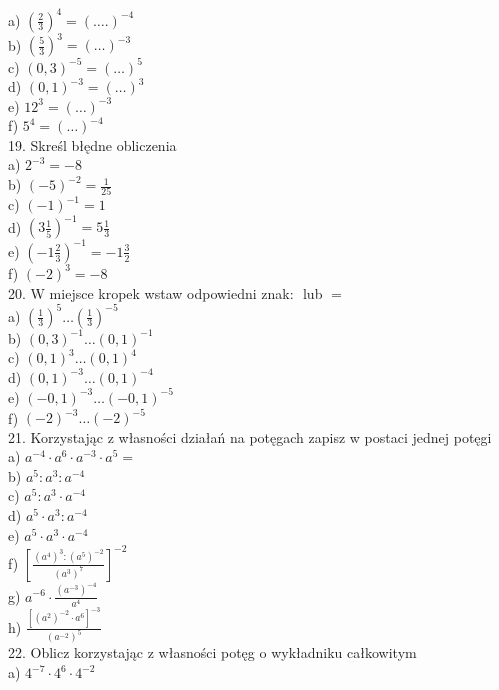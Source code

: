\documentclass[10pt]{article}
\begin{document}
a) \(\left(\frac{2}{3}\right)^{4}=(\ldots .)^{-4}\)\\
b) \(\left(\frac{5}{3}\right)^{3}=(\ldots)^{-3}\)\\
c) \((0,3)^{-5}=(\ldots)^{5}\)\\
d) \((0,1)^{-3}=(\ldots)^{3}\)\\
e) \(12^{3}=(\ldots)^{-3}\)\\
f) \(5^{4}=(\ldots)^{-4}\)\\
19. Skreśl błędne obliczenia\\
a) \(2^{-3}=-8\)\\
b) \((-5)^{-2}=\frac{1}{25}\)\\
c) \((-1)^{-1}=1\)\\
d) \(\left(3 \frac{1}{5}\right)^{-1}=5 \frac{1}{3}\)\\
e) \(\left(-1 \frac{2}{3}\right)^{-1}=-1 \frac{3}{2}\)\\
f) \((-2)^{3}=-8\)\\
20. W miejsce kropek wstaw odpowiedni znak: \(<,>\) lub \(=\)\\
a) \(\left(\frac{1}{3}\right)^{5} \ldots\left(\frac{1}{3}\right)^{-5}\)\\
b) \((0,3)^{-1} \ldots(0,1)^{-1}\)\\
c) \((0,1)^{3} \ldots(0,1)^{4}\)\\
d) \((0,1)^{-3} \ldots(0,1)^{-4}\)\\
e) \((-0,1)^{-3} \ldots(-0,1)^{-5}\)\\
f) \((-2)^{-3} \ldots(-2)^{-5}\)\\
21. Korzystając z własności działań na potęgach zapisz w postaci jednej potęgi\\
a) \(a^{-4} \cdot a^{6} \cdot a^{-3} \cdot a^{5}=\)\\
b) \(a^{5}: a^{3}: a^{-4}\)\\
c) \(a^{5}: a^{3} \cdot a^{-4}\)\\
d) \(a^{5} \cdot a^{3}: a^{-4}\)\\
e) \(a^{5} \cdot a^{3} \cdot a^{-4}\)\\
f) \(\left[\frac{\left(a^{4}\right)^{3}:\left(a^{5}\right)^{-2}}{\left(a^{3}\right)^{7}}\right]^{-2}\)\\
g) \(a^{-6} \cdot \frac{\left(a^{-3}\right)^{-4}}{a^{4}}\)\\
h) \(\frac{\left[\left(a^{2}\right)^{-2} \cdot a^{6}\right]^{-3}}{\left(a^{-2}\right)^{5}}\)\\
22. Oblicz korzystając z własności potęg o wykładniku całkowitym\\
a) \(4^{-7} \cdot 4^{6} \cdot 4^{-2}\)\\
\end{document}
